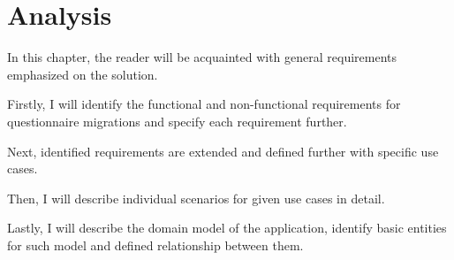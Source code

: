 \chapter{Analysis}\label{cptr:analysis}

In this chapter, the reader will be acquainted with general requirements emphasized on the solution.

Firstly, I will identify the functional and non-functional requirements for questionnaire migrations and specify each requirement further.

Next, identified requirements are extended and defined further with specific use cases.

Then, I will describe individual scenarios for given use cases in detail.

Lastly, I will describe the domain model of the application, identify basic entities for such model and defined relationship between them.





